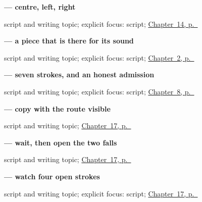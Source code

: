 \noindent\begin{minipage}[t]{\linewidth}
\raggedright
\textbf{ — centre, left, right}\par
\footnotesize script and writing topic; explicit focus: script; \hyperref[ch:zh-primary-three]{Chapter~14, p.~\pageref*{ch:zh-primary-three}}
\end{minipage}\par\smallskip

\noindent\begin{minipage}[t]{\linewidth}
\raggedright
\textbf{ — a piece that is there for its sound}\par
\footnotesize script and writing topic; explicit focus: script; \hyperref[ch:zh-components]{Chapter~2, p.~\pageref*{ch:zh-components}}
\end{minipage}\par\smallskip

\noindent\begin{minipage}[t]{\linewidth}
\raggedright
\textbf{ — seven strokes, and an honest admission}\par
\footnotesize script and writing topic; explicit focus: script; \hyperref[ch:zh-mingzi]{Chapter~8, p.~\pageref*{ch:zh-mingzi}}
\end{minipage}\par\smallskip

\noindent\begin{minipage}[t]{\linewidth}
\raggedright
\textbf{ — copy with the route visible}\par
\footnotesize script and writing topic; \hyperref[ch:zh-language-country]{Chapter~17, p.~\pageref*{ch:zh-language-country}}
\end{minipage}\par\smallskip

\noindent\begin{minipage}[t]{\linewidth}
\raggedright
\textbf{ — wait, then open the two falls}\par
\footnotesize script and writing topic; \hyperref[ch:zh-language-country]{Chapter~17, p.~\pageref*{ch:zh-language-country}}
\end{minipage}\par\smallskip

\noindent\begin{minipage}[t]{\linewidth}
\raggedright
\textbf{ — watch four open strokes}\par
\footnotesize script and writing topic; explicit focus: script; \hyperref[ch:zh-language-country]{Chapter~17, p.~\pageref*{ch:zh-language-country}}
\end{minipage}\par\smallskip

